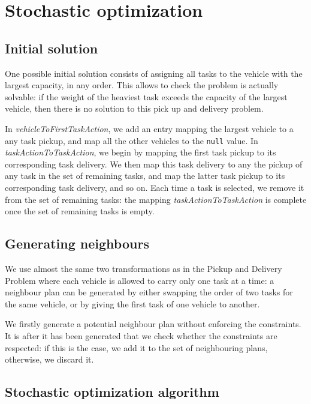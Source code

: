 \documentclass[10pt]{article}
\begin{document}
\section{Stochastic optimization}

\subsection{Initial solution}

One possible initial solution consists of assigning all tasks to the vehicle with the largest capacity, in any order. This allows to check the problem is actually solvable: if the weight of the heaviest task exceeds the capacity of the largest vehicle, then there is no solution to this pick up and delivery problem.

In \textit{vehicleToFirstTaskAction}, we add an entry mapping the largest vehicle to a any task pickup, and map all the other vehicles to the \texttt{null} value.
In \textit{taskActionToTaskAction}, we begin by mapping the first task pickup to its corresponding task delivery. We then map this task delivery to any the pickup of any task in the set of remaining tasks, and map the latter task pickup to its corresponding task delivery, and so on.
Each time a task is selected, we remove it from the set of remaining tasks: the mapping \textit{taskActionToTaskAction} is complete once the set of remaining tasks is empty.

\subsection{Generating neighbours}

We use almost the same two transformations as in the Pickup and Delivery Problem where each vehicle is allowed to carry only one task at a time: a neighbour plan can be generated by either swapping the order of two tasks for the same vehicle, or by giving the first task of one vehicle to another.

We firstly generate a potential neighbour plan without enforcing the constraints. It is after it has been generated that we check whether the constraints are respected: if this is the case, we add it to the set of neighbouring plans, otherwise, we discard it.

\subsection{Stochastic optimization algorithm}
\end{document}
